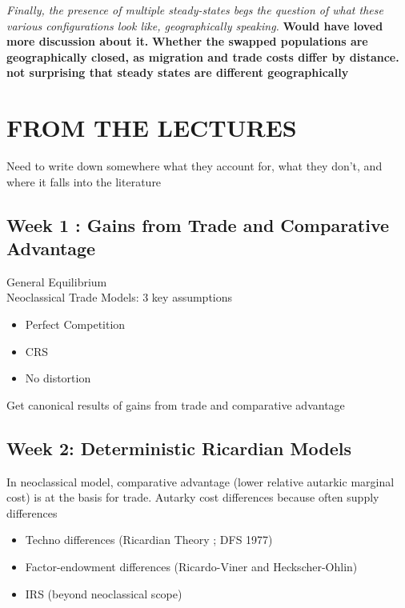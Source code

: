 \documentclass[10pt, final]{article}
\begin{document}
\textit{Finally, the presence of multiple steady-states begs the question of what these various configurations look like, geographically speaking.} \textbf{Would have loved more discussion about it. } \textbf{Whether the swapped populations are geographically closed, as migration and trade costs differ by distance. not surprising that steady states are different geographically}




\newpage











\newpage



\section{FROM THE LECTURES} %
\label{sec:from_the_lectures}

Need to write down somewhere what they account for, what they don't, and where it falls into the literature

\subsection{Week 1 : Gains from Trade and Comparative Advantage} %
\label{sub:week_1_gains_from_trade_and_comparative_advantage}

General Equilibrium
\\
Neoclassical Trade Models: 3 key assumptions
\begin{itemize}
    \item Perfect Competition
    \item CRS
    \item No distortion
\end{itemize}
Get canonical results of gains from trade and comparative advantage

\subsection{Week 2: Deterministic Ricardian Models} %
\label{sub:week_2_deterministic_ricardian_models}

In neoclassical model, comparative advantage (lower relative autarkic marginal cost) is at the basis for trade. Autarky cost differences because often supply differences
\begin{itemize}
    \item Techno differences (Ricardian Theory ; DFS 1977)
    \item Factor-endowment differences (Ricardo-Viner and Heckscher-Ohlin)
    \item IRS (beyond neoclassical scope)
\end{itemize}
\end{document}

